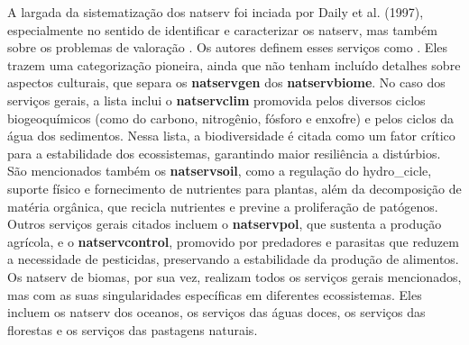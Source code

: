 \documentclass[./main.tex]{subfiles}
\begin{document}
\par A largada da sistematização dos \gls{natserv} foi inciada por Daily et al. (1997), especialmente no sentido de identificar e caracterizar os \gls{natserv}, mas também sobre os problemas de valoração \cite{daily1997}. Os autores definem esses serviços como . Eles trazem uma categorização pioneira, ainda que não tenham incluído detalhes sobre aspectos culturais, que separa os \textbf{\gls{natservgen}} dos \textbf{\gls{natservbiome}}. No caso dos serviços gerais, a lista inclui o \textbf{\gls{natservclim}} promovida pelos diversos ciclos biogeoquímicos (como do carbono, nitrogênio, fósforo e enxofre) e pelos ciclos da água dos sedimentos. Nessa lista, a biodiversidade é citada como um fator crítico para a estabilidade dos ecossistemas, garantindo maior resiliência a distúrbios. São mencionados também os \textbf{\gls{natservsoil}}, como a regulação do \gls{hydro_cicle}, suporte físico e fornecimento de nutrientes para plantas, além da decomposição de matéria orgânica, que recicla nutrientes e previne a proliferação de patógenos. Outros serviços gerais citados incluem o \textbf{\gls{natservpol}}, que sustenta a produção agrícola, e o \textbf{\gls{natservcontrol}}, promovido por predadores e parasitas que reduzem a necessidade de pesticidas, preservando a estabilidade da produção de alimentos. Os \gls{natserv} de biomas, por sua vez, realizam todos os serviços gerais mencionados, mas com as suas singularidades específicas em diferentes ecossistemas. Eles incluem os \gls{natserv} dos oceanos, os serviços das águas doces, os serviços das florestas e os serviços das pastagens naturais.
\end{document}
